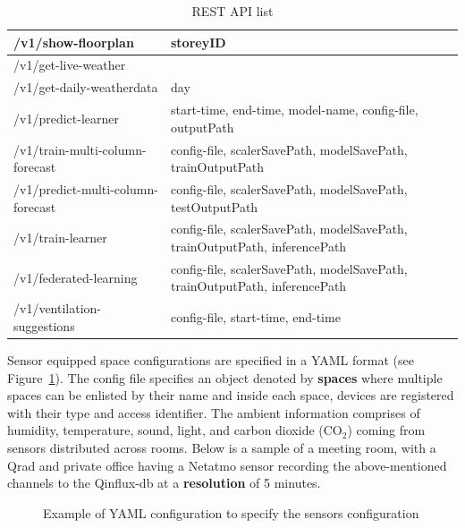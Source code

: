 \begin{table}[]
\begin{tabular}{@{}|l|l|@{}}
/v1/show-floorplan                  & storeyID                                                                          \\ \midrule
/v1/get-live-weather               &                                                                                   \\ \midrule
/v1/get-daily-weatherdata          & day                                                                               \\ \midrule
/v1/predict-learner                 & start-time, end-time, model-name,  config-file, outputPath                    \\ \midrule
/v1/train-multi-column-forecast   & config-file,  scalerSavePath,  modelSavePath,  trainOutputPath                   \\ \midrule
/v1/predict-multi-column-forecast & config-file, scalerSavePath,  modelSavePath,  testOutputPath                     \\ \midrule
/v1/train-learner                   & config-file, scalerSavePath,  modelSavePath,  trainOutputPath, inferencePath     \\ \midrule
/v1/federated-learning              & config-file, scalerSavePath,  modelSavePath,  trainOutputPath, inferencePath     \\ \midrule
/v1/ventilation-suggestions     & config-file, start-time, end-time  \\ \bottomrule
\end{tabular}
\caption{REST API list}
\label{table:apilist}
\end{table}


 Sensor equipped space configurations are specified in a YAML format (see Figure~\ref{fig:yaml_sensor}). The config file specifies an object denoted by \textbf{spaces} where multiple spaces can be enlisted by their name and inside each space, devices are registered with their type and access identifier. The ambient information comprises of humidity, temperature, sound, light, and carbon dioxide (CO$_2$) coming from sensors distributed across rooms. Below is a sample of a meeting room, with a Qrad and private office having a Netatmo sensor recording the above-mentioned channels to the Qinflux-db at a \textbf{resolution} of 5 minutes.

\begin{figure}[h!]
     \centering
      \caption{Example of YAML configuration to specify the sensors configuration}%
    \label{fig:yaml_sensor}%
\end{figure}


